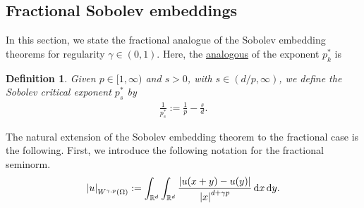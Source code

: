 \documentclass[
    a4paper,
    DIV=14,
    abstract=true,
    numbers=noenddot
]
{scrartcl}
\newtheorem{definition}[theorem]{Definition}
\theoremstyle{definition}
\renewcommand{\d}{\,\mathrm{d}}\newcommand{\dx}{\,\mathrm{d}x}
\newcommand{\R}{\mathbb{R}}
\begin{document}
\subsection{Fractional Sobolev embeddings}\label{fractional embeddings}
In this section, we state the fractional analogue of the Sobolev embedding theorems for regularity $\gamma \in (0,1)$.
Here, the \href{https://nowheredifferentiable.com/2023-07-12-PDEs-3-Sobolev_spaces/#global:~:text=concludes%20the%20proof.%C2%A0%E2%97%BB-,Exercise,-24%20.%20Given}{analogous} of the exponent $p_k^{*}$ is
\begin{definition}
    Given $p \in [1,\infty)$ and $s>0$, with $s\in (d/p, \infty)$, we define the \emph{Sobolev critical exponent} $p_s^*$ by
    \begin{align*}
        \frac{1}{p_s ^*}:=\frac{1}{p}-\frac{s }{d}.
    \end{align*}
\end{definition}
The natural extension of the Sobolev embedding theorem to the fractional case is the following. First, we introduce the following notation for the fractional seminorm.
\begin{align*}
    \abs{u}_{W^{\gamma, p}(\Omega )}:=\int_{\R^d}\int_{\R^d}\frac{\abs{u(x+y)-u(y)}}{\abs{x}^{d+\gamma p}}\d x \d y.
\end{align*}
\end{document}
